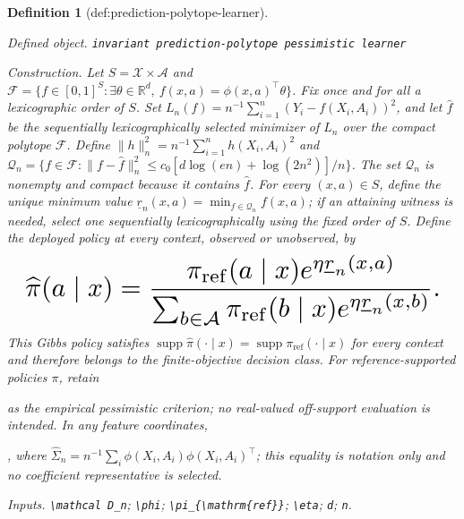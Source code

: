 \documentclass{article}
\newtheorem{definition}{Definition}
\begin{document}
\begin{definition}[def:prediction-polytope-learner]\label{def:prediction-polytope-learner}
\par\smallskip\noindent\emph{Defined object.} \texttt{invariant prediction-\allowbreak{}polytope pessimistic learner}
\par\smallskip\noindent\emph{Construction.} Let \(S=\mathcal X\times\mathcal A\) and \(\mathcal F=\{f\in[0,1]^S:\exists\theta\in\mathbb R^d,\ f(x,a)=\phi(x,a)^\top\theta\}\). Fix once and for all a lexicographic order of \(S\). Set \(L_n(f)=n^{-1}\sum_{i=1}^n(Y_i-f(X_i,A_i))^2\), and let \(\widehat f\) be the sequentially lexicographically selected minimizer of \(L_n\) over the compact polytope \(\mathcal F\). Define \(\|h\|_n^2=n^{-1}\sum_{i=1}^nh(X_i,A_i)^2\) and \(\mathcal Q_n=\{f\in\mathcal F:\|f-\widehat f\|_n^2\le c_0[d\log(en)+\log(2n^2)]/n\}\). The set \(\mathcal Q_n\) is nonempty and compact because it contains \(\widehat f\). For every \((x,a)\in S\), define the unique minimum value \(\underline r_n(x,a)=\min_{f\in\mathcal Q_n}f(x,a)\); if an attaining witness is needed, select one sequentially lexicographically using the fixed order of \(S\). Define the deployed policy at every context, observed or unobserved, by
\[
\makebox[\linewidth][c]{\resizebox{0.98\linewidth}{!}{\par\noindent \makebox[\linewidth][c]{\resizebox{0.98\linewidth}{!}{\(\displaystyle \displaystyle \widehat\pi(a\mid x)=\frac{\pi_{\mathrm{ref}}(a\mid x)e^{\eta\underline r_n(x,a)}}{\sum_{b\in\mathcal A}\pi_{\mathrm{ref}}(b\mid x)e^{\eta\underline r_n(x,b)}}.\)}}\par\noindent}}
\]
This Gibbs policy satisfies \(\operatorname{supp}\widehat\pi(\cdot\mid x)=\operatorname{supp}\pi_{\mathrm{ref}}(\cdot\mid x)\) for every context and therefore belongs to the finite-objective decision class. For reference-supported policies \(\pi\), retain \par\noindent {}\par\noindent as the empirical pessimistic criterion; no real-valued off-support evaluation is intended. In any feature coordinates, \par\noindent {}\par\noindent, where \(\widehat\Sigma_n=n^{-1}\sum_i\phi(X_i,A_i)\phi(X_i,A_i)^\top\); this equality is notation only and no coefficient representative is selected.
\par\smallskip\noindent\emph{Inputs.} \texttt{\textbackslash{}\allowbreak{}mathcal D\_\allowbreak{}n}; \texttt{\textbackslash{}\allowbreak{}phi}; \texttt{\textbackslash{}\allowbreak{}pi\_\allowbreak{}\{\textbackslash{}\allowbreak{}mathrm\{ref\}\allowbreak{}\}\allowbreak{}}; \texttt{\textbackslash{}\allowbreak{}eta}; \texttt{d}; \texttt{n}.
\end{definition}
\end{document}

